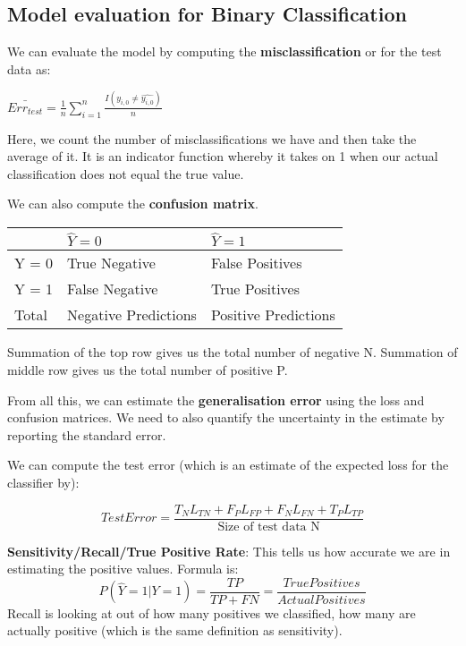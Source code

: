 \documentclass[11pt, oneside]{article}
\theoremstyle{definition}
\begin{document}
\subsection{Model evaluation for Binary Classification}
We can evaluate the model by computing the \textbf{misclassification} or  for the test data as:\\
\begin{center}
$\bar{Err_{test}} = \frac{1}{n} \sum_{i=1}^{n}\frac{I(y_{i,0} \neq \hat{y_{i,0}})}{n}$
\end{center}
Here, we count the number of misclassifications we have and then take the average of it. It is an indicator function whereby it takes on 1 when our actual classification does not equal the true value.

We can also compute the \textbf{confusion matrix}.

\begin{center}
\begin{tabu} to 0.8\textwidth { | X[l] | X[c] | X[r] |}
 \hline
  & $\hat{Y} = 0$  & $\hat{Y} = 1$ \\
 \hline
 Y = 0  &True Negative  & False Positives \\
\hline
 Y = 1  & False Negative & True Positives  \\
\hline
Total  & Negative Predictions & Positive Predictions  \\
\hline
\end{tabu}
\end{center}

Summation of the top row gives us the total number of negative N. Summation of middle row gives us the total number of positive P.

From all this, we can estimate the \textbf{generalisation error} using the loss and confusion matrices. We need to also quantify the uncertainty in the estimate by reporting the standard error.

We can compute the test error (which is an estimate of the expected loss for the classifier by):

\begin{equation}
  Test Error = \frac{T_NL_{TN} + F_PL_{FP} + F_NL_{FN} + T_PL_{TP}}{\text{Size of test data N}}
\end{equation}

\textbf{Sensitivity/Recall/True Positive Rate}: This tells us how accurate we are in estimating the positive values. Formula is:
\begin{equation}
  P(\hat{Y} = 1 |Y = 1) = \frac{TP}{TP + FN} = \frac{True Positives}{Actual Positives}
  \end{equation}
Recall is looking at out of how many positives we classified, how many are actually positive (which is the same definition as sensitivity).
\end{document}
